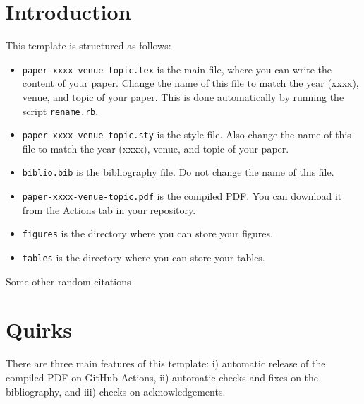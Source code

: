 \documentclass[final,5pt,times,twocolumn]{elsarticle}
\begin{document}
    \section{Introduction}\label{sec:introduction}
        This template is structured as follows:
        \begin{itemize}
            \item[] \texttt{paper-xxxx-venue-topic.tex} is the main file, where you can write the content of your paper.
            Change the name of this file to match the year (xxxx), venue, and topic of your paper.
            This is done automatically by running the script \texttt{rename.rb}.
            \item[] \texttt{paper-xxxx-venue-topic.sty} is the style file.
            Also change the name of this file to match the year (xxxx), venue, and topic of your paper.
            \item[] \texttt{biblio.bib} is the bibliography file.
            Do not change the name of this file.
            \item[] \texttt{paper-xxxx-venue-topic.pdf} is the compiled PDF.
            You can download it from the Actions tab in your repository.
            \item[] \texttt{figures} is the directory where you can store your figures.
            \item[] \texttt{tables} is the directory where you can store your tables.
        \end{itemize}
    Some other random citations~\cite{DBLP:conf/percom/MontagnaAFPKUM24,DBLP:conf/dlog/MagniniOS24}

    \section{Quirks}\label{sec:quirks}
        There are three main features of this template: i) automatic release of the compiled PDF on GitHub Actions, ii) automatic checks and fixes on the bibliography, and iii) checks on acknowledgements.
\end{document}
